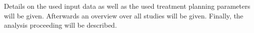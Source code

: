 \documentclass[type=dr, dr=rernat, accentcolor=tud7b,colorbacktitle, bigchapter, openright, twoside, 12pt ]{tudthesis}
\begin{document}
% 
% 
% 
% 
% 
% 
% 
% 
% 


Details on the used input data as well as the used treatment planning parameters will be given. Afterwards an overview over all 
studies will be given. Finally, the analysis proceeding will be described.  
\end{document}
